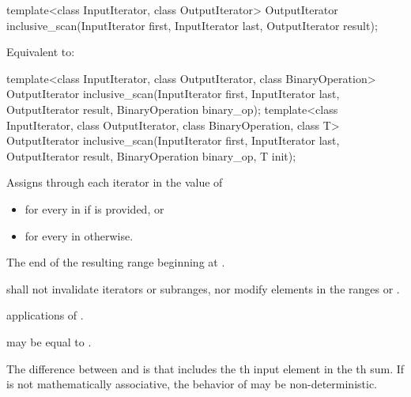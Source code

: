 %
\begin{itemdecl}
template<class InputIterator, class OutputIterator>
  OutputIterator inclusive_scan(InputIterator first, InputIterator last,
                                OutputIterator result);
\end{itemdecl}

\begin{itemdescr}
\pnum
\effects
Equivalent to: 
\end{itemdescr}

%
\begin{itemdecl}
template<class InputIterator, class OutputIterator, class BinaryOperation>
  OutputIterator inclusive_scan(InputIterator first, InputIterator last,
                                OutputIterator result,
                                BinaryOperation binary_op);
template<class InputIterator, class OutputIterator, class BinaryOperation, class T>
  OutputIterator inclusive_scan(InputIterator first, InputIterator last,
                                OutputIterator result,
                                BinaryOperation binary_op, T init);
\end{itemdecl}

\begin{itemdescr}
\pnum
\effects
Assigns through each iterator  in  the value of
\begin{itemize}
\item
{}
for every  in 
if  is provided, or
\item
{}
for every  in  otherwise.
\end{itemize}

\pnum
\returns
The end of the resulting range beginning at .

\pnum
\requires
{} shall not invalidate iterators or subranges, nor modify
elements in the ranges  or .

\pnum
\complexity
{} applications of .

\pnum
\remarks
{} may be equal to .

\pnum
\realnotes
The difference between  and  is
that  includes the th input element in the
th sum.  If  is not mathematically associative, the
behavior of  may be non-deterministic.
\end{itemdescr}


